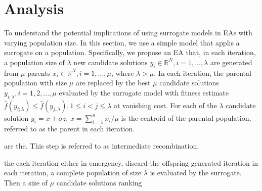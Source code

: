 \section{Analysis}


To understand the potential implications of using surrogate models in EAs with varying population size. 
In this section, we use a simple model that applis a surrogate on a population. Specifically, we propose an EA that, in each iteration, a population size of $\lambda$ new candidate solutions $y_i \in \mathbb{R}^N,i = 1,...,\lambda $ are generated from $\mu$ parents $x_i \in \mathbb{R}^N, i=1,...,\mu$, where $\lambda>\mu$. In each iteration, the parental population with size $\mu$ are replaced by the best $\mu$ candidate solutions $y_{i;\lambda},i = 1,2,...,\mu$ evaluated by the surrogate model with fitness estimate $\hat f(y_{i;\lambda}) \leq \hat f(y_{j,\lambda}), 1 \leq i < j \leq \lambda$ at vanishing cost. For each of the $\lambda$ candidate solution $y_i=x + \sigma z$, $x = \sum_{i=1}^n x_i/\mu$ is the centroid of the parental population, referred to as the parent in each iteration. 

 are the. This step is referred to as intermediate recombination.  

the each iteration either in emergency, discard the offspring generated iteration 
in  each iteration, a complete population of size $\lambda$ is evaluated by the surrogate. Then a size of $\mu$ candidate solutions ranking 


